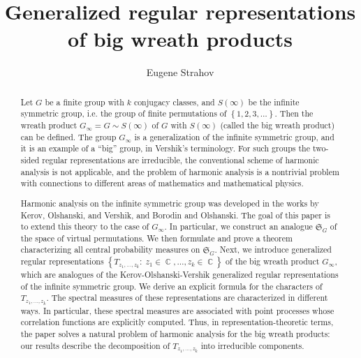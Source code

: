 \documentclass[12pt]{amsart}
\theoremstyle{definition}
\numberwithin{equation}{section}
\DeclareMathOperator{\C}{\mathbb{C}}
\begin{document}
\title[Generalized regular representations of  big wreath products]
{\bf{Generalized regular representations of  big wreath products}}

\author{Eugene Strahov}
\address{Department of Mathematics, The Hebrew University of Jerusalem, Givat Ram, Jerusalem 91904, Israel}
\commby{}
\begin{abstract}
Let $G$ be a finite group with $k$ conjugacy classes, and $S(\infty)$ be the infinite symmetric group, i.e. the group of finite permutations of $\left\{1,2,3,\ldots\right\}$. Then the wreath product $G_{\infty}=G\sim S(\infty)$
of $G$ with $S(\infty)$  (called the big wreath product) can be defined. The group $G_{\infty}$ is a generalization of the infinite symmetric group, and it is  an example of a
``big'' group, in Vershik's terminology. For such groups  the two-sided regular
representations are irreducible, the conventional scheme of harmonic analysis
is not applicable, and the problem of harmonic analysis is a nontrivial problem with connections
to different areas of mathematics and mathematical physics.

Harmonic analysis on the infinite symmetric group
was developed in the works by Kerov, Olshanski, and Vershik, and Borodin and Olshanski. The goal of this
paper is to extend this theory to the case of
$G_{\infty}$.
In particular,  we construct  an analogue $\mathfrak{S}_{G}$ of the space of virtual permutations. We then formulate  and prove a theorem characterizing all central probability
measures on $\mathfrak{S}_{G}$. Next, we introduce generalized regular representations $\left\{T_{z_1,\ldots,z_k}:\; z_1\in\C,\ldots,z_k\in\C\right\}$ of the big wreath product $G_{\infty}$, which are
analogues of the Kerov-Olshanski-Vershik generalized regular representations
of the infinite symmetric group. We derive an explicit formula for the characters
of $T_{z_1,\ldots,z_k}$. The spectral measures of these representations are characterized in different ways. In particular, these spectral measures are associated with point processes whose correlation functions are explicitly computed. Thus, in representation-theoretic terms, the paper solves a natural problem of harmonic analysis for the big wreath products:
our results describe the decomposition of $T_{z_1,\ldots,z_k}$ into irreducible components.



\end{abstract}
\maketitle
\end{document}
